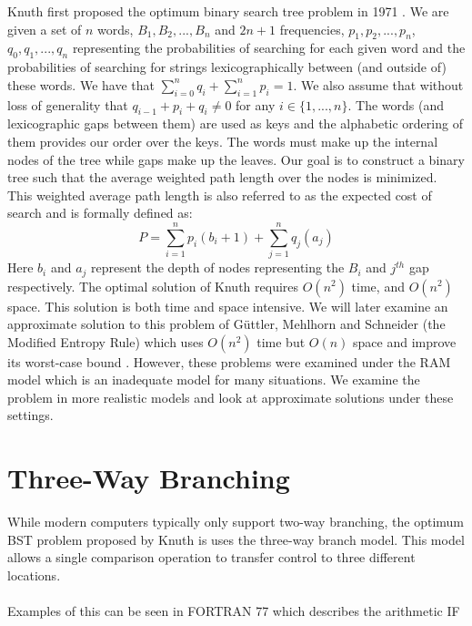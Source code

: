 \documentclass[letterpaper,12pt,titlepage,oneside,final]{book}
\theoremstyle{plain}
\begin{document}
Knuth first proposed the optimum binary search tree problem in 1971 \cite{knuth1971optimum}. We are given a set of $n$ words, $B_1, B_2, ..., B_n$ and $2n+1$ frequencies, ${p_1, p_2, ..., p_n}$, ${q_0, q_1, ..., q_n}$ representing the probabilities of searching for each given word and the probabilities of searching for strings lexicographically between (and outside of) these words. We have that $ \sum\limits_{i=0}^n q_i + \sum\limits_{i=1}^n p_i = 1$. We also assume that without loss of generality that $q_{i-1}+p_i+q_i \neq 0$ for any $i \in \{1,...,n\}$. The words (and lexicographic gaps between them) are used as keys and the alphabetic ordering of them provides our order over the keys. The words must make up the internal nodes of the tree while gaps make up the leaves. Our goal is to construct a binary tree such that the average weighted path length over the nodes is minimized.  This weighted average path length is also referred to as the expected cost of search and is formally defined as: 
\begin{equation}
P = \sum_{i=1}^{n} p_i(b_i+1) + \sum_{j=1}^{n} q_j(a_j)
\end{equation}
Here $b_i$ and $a_j$ represent the depth of nodes representing the $B_i$ and $j^{th}$ gap respectively. The optimal solution of Knuth requires $O(n^2)$ time, and $O(n^2)$ space. This solution is both time and space intensive. We will later examine an approximate solution to this problem of G{\"u}ttler, Mehlhorn and Schneider (the Modified Entropy Rule) which uses $O(n^2)$ time but $O(n)$ space and improve its worst-case bound \cite{guttler1980binary}. However, these problems were examined under the RAM model which is an inadequate model for many situations. We examine the problem in more realistic models and look at approximate solutions under these settings.

\section{Three-Way Branching}


While modern computers typically only support two-way branching, the optimum BST problem proposed by Knuth is uses the three-way branch model. This model allows a single comparison operation to transfer control to three different locations. \\~\\ Examples of this can be seen in FORTRAN 77 which describes the arithmetic IF \cite{fortran} \\
\end{document}
